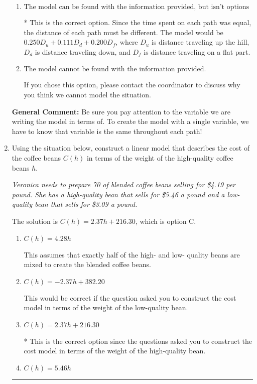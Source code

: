 \documentclass{extbook}[14pt]
\newcommand{\litem}[1]{\item #1

\rule{\textwidth}{0.4pt}}
\begin{document}
\begin{enumerate}
{\begin{enumerate}[label=\Alph*.]
This would be correct if we knew all parts of the path are equal length.
\item \( \text{The model can be found with the information provided, but isn't options 1-3.} \)

* This is the correct option. Since the time spent on each path was equal, the distance of each path must be different. The model would be $0.250D_u + 0.111D_d + 0.200D_f$, where $D_u$ is distance traveling up the hill, $D_d$ is distance traveling down, and $D_f$ is distance traveling on a flat part.
\item \( \text{The model cannot be found with the information provided.} \)

If you chose this option, please contact the coordinator to discuss why you think we cannot model the situation.
\end{enumerate}

\textbf{General Comment:} Be sure you pay attention to the variable we are writing the model in terms of. To create the model with a single variable, we have to know that variable is the same throughout each path!
}
\litem{
Using the situation below, construct a linear model that describes the cost of the coffee beans $C(h)$ in terms of the weight of the high-quality coffee beans $h$.

\begin{center}
    \textit{ Veronica needs to prepare 70 of blended coffee beans selling for \$4.19 per pound. She has a high-quality bean that sells for \$5.46 a pound and a low-quality bean that sells for \$3.09 a pound. }
\end{center}
The solution is \( C(h) = 2.37 h + 216.30 \), which is option C.\begin{enumerate}[label=\Alph*.]
\item \( C(h) = 4.28 h \)

This assumes that exactly half of the high- and low- quality beans are mixed to create the blended coffee beans.
\item \( C(h) = -2.37 h + 382.20 \)

This would be correct if the question asked you to construct the cost model in terms of the weight of the low-quality bean.
\item \( C(h) = 2.37 h + 216.30 \)

* This is the correct option since the questions asked you to construct the cost model in terms of the weight of the high-quality bean.
\item \( C(h) = 5.46 h \)


\end{enumerate}}
\end{enumerate}
\end{document}
